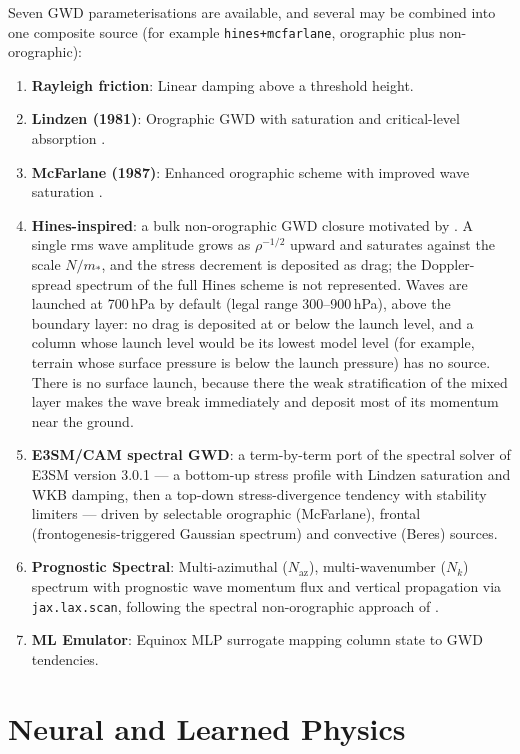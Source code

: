 \documentclass[11pt,twoside]{report}
\begin{document}
Seven GWD parameterisations are available, and several may be combined into
one composite source (for example \texttt{hines+mcfarlane}, orographic plus
non-orographic):
\begin{enumerate}[nosep]
  \item \textbf{Rayleigh friction}: Linear damping above a threshold height.
  \item \textbf{Lindzen (1981)}: Orographic GWD with saturation and critical-level absorption \citep{Lindzen1981}.
  \item \textbf{McFarlane (1987)}: Enhanced orographic scheme with improved wave saturation \citep{McFarlane1987}.
  \item \textbf{Hines-inspired}: a bulk non-orographic GWD closure motivated by \citet{Hines1997}.  A single rms wave amplitude grows as $\rho^{-1/2}$ upward and saturates against the scale $N/m_*$, and the stress decrement is deposited as drag; the Doppler-spread spectrum of the full Hines scheme is not represented.  Waves are launched at 700\,hPa by default (legal range 300--900\,hPa), above the boundary layer: no drag is deposited at or below the launch level, and a column whose launch level would be its lowest model level (for example, terrain whose surface pressure is below the launch pressure) has no source.  There is no surface launch, because there the weak stratification of the mixed layer makes the wave break immediately and deposit most of its momentum near the ground.
  \item \textbf{E3SM/CAM spectral GWD}: a term-by-term port of the
    spectral solver of E3SM version 3.0.1 --- a bottom-up stress
    profile with Lindzen saturation and WKB damping, then a top-down
    stress-divergence tendency with stability limiters --- driven by
    selectable orographic (McFarlane), frontal (frontogenesis-triggered
    Gaussian spectrum) and convective (Beres) sources.
  \item \textbf{Prognostic Spectral}: Multi-azimuthal ($N_{\mathrm{az}}$), multi-wavenumber ($N_k$) spectrum with prognostic wave momentum flux and vertical propagation via \texttt{jax.lax.scan}, following the spectral non-orographic approach of \citet{AlexanderDunkerton1999}.
  \item \textbf{ML Emulator}: Equinox MLP surrogate mapping column state to GWD tendencies.
\end{enumerate}

\section{Neural and Learned Physics}
\end{document}
